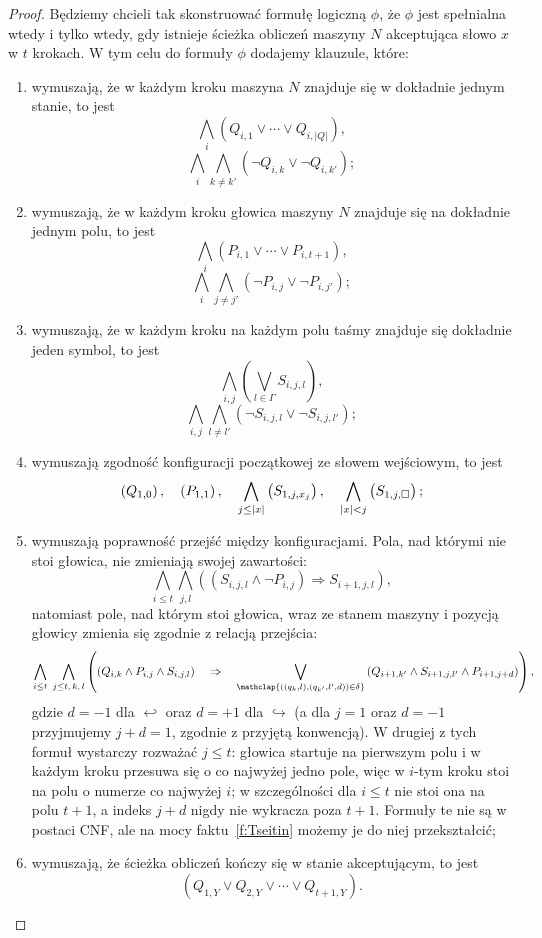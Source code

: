 \begin{proof}
    Będziemy chcieli tak skonstruować formułę logiczną $\phi$, że $\phi$ jest spełnialna wtedy i tylko wtedy, gdy istnieje ścieżka obliczeń maszyny $N$ akceptująca słowo $x$ w $t$ krokach. W tym celu do formuły $\phi$ dodajemy klauzule, które:
    \begin{enumerate}
        \item wymuszają, że w każdym kroku maszyna $N$ znajduje się w dokładnie jednym stanie, to jest
        \[ \bigwedge_i \left(Q_{i, 1} \lor \cdots \lor Q_{i, |Q|}\right), \]
        \[ \bigwedge_i \bigwedge_{k \neq k'} \left(\neg Q_{i, k} \lor \neg Q_{i, k'}\right); \]
        \item wymuszają, że w każdym kroku głowica maszyny $N$ znajduje się na dokładnie jednym polu, to jest
        \[ \bigwedge_i \left(P_{i, 1} \lor \cdots \lor P_{i, t+1}\right), \]
        \[ \bigwedge_i \bigwedge_{j \neq j'} \left(\neg P_{i, j} \lor \neg P_{i, j'}\right); \]
        \item wymuszają, że w każdym kroku na każdym polu taśmy znajduje się dokładnie jeden symbol, to jest
        \[ \bigwedge_{i, j} \left(\bigvee_{l \in \Gamma} S_{i, j, l}\right), \]
        \[ \bigwedge_{i, j} \bigwedge_{l \neq l'} \left(\neg S_{i, j, l} \lor \neg S_{i, j, l'}\right); \]
        \item wymuszają zgodność konfiguracji początkowej ze słowem wejściowym, to jest
        \[ \left(Q_{1, 0}\right), \quad \left(P_{1, 1}\right), \quad \bigwedge_{j \leq |x|} \left(S_{1, j, x_j}\right), \quad \bigwedge_{|x| < j} \left(S_{1, j, \square}\right); \]
        \item wymuszają poprawność przejść między konfiguracjami. Pola, nad którymi nie stoi głowica, nie zmieniają swojej zawartości:
        \[ \bigwedge_{i \leq t} \bigwedge_{j, l} \left(\left(S_{i, j, l} \land \neg P_{i, j}\right) \Rightarrow S_{i+1, j, l}\right), \]
        natomiast pole, nad którym stoi głowica, wraz ze stanem maszyny i pozycją głowicy zmienia się zgodnie z relacją przejścia:
        \[ \bigwedge_{i \leq t} \; \bigwedge_{j \leq t, \, k, \, l} \left(\left(Q_{i, k} \land P_{i, j} \land S_{i, j, l}\right) \quad \Rightarrow \quad \bigvee_{\mathclap{\left((q_k, l), (q_{k'}, l', d)\right) \in \delta}} \left(Q_{i+1, k'} \land S_{i+1, j, l'} \land P_{i+1, j+d}\right)\right), \]
        gdzie $d = -1$ dla $\hookleftarrow$ oraz $d = +1$ dla $\hookrightarrow$ (a dla $j = 1$ oraz $d = -1$ przyjmujemy $j + d = 1$, zgodnie z przyjętą konwencją). W drugiej z tych formuł wystarczy rozważać $j \leq t$: głowica startuje na pierwszym polu i w każdym kroku przesuwa się o co najwyżej jedno pole, więc w $i$-tym kroku stoi na polu o numerze co najwyżej $i$; w szczególności dla $i \leq t$ nie stoi ona na polu $t+1$, a indeks $j + d$ nigdy nie wykracza poza $t+1$. Formuły te nie są w postaci CNF, ale na mocy faktu~\ref{f:Tseitin} możemy je do niej przekształcić;
        \item wymuszają, że ścieżka obliczeń kończy się w stanie akceptującym, to jest
        \[ \left( Q_{1, Y} \lor Q_{2, Y} \lor \cdots \lor Q_{t+1, Y} \right). \]
    \end{enumerate}


\end{proof}
